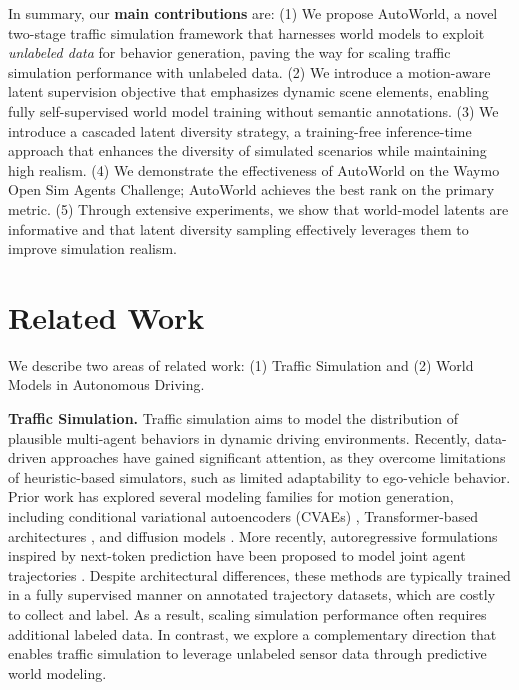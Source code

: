 \documentclass[runningheads]{llncs}
\begin{document}
In summary, our \textbf{main contributions} are: (1) We propose AutoWorld, a novel two-stage traffic simulation framework that harnesses world models to exploit \textit{unlabeled data} for behavior generation, paving the way for scaling traffic simulation performance with unlabeled data. (2) We introduce a motion-aware latent supervision objective that emphasizes dynamic scene elements, enabling fully self-supervised world model training without semantic annotations. (3) We introduce a cascaded latent diversity strategy, a training-free inference-time approach that enhances the diversity of simulated scenarios while maintaining high realism. (4) We demonstrate the effectiveness of AutoWorld on the Waymo Open Sim Agents Challenge; AutoWorld achieves the best rank on the primary metric. (5) Through extensive experiments, we show that world-model latents are informative and that latent diversity sampling effectively leverages them to improve simulation realism.



\vspace{-2mm}

\section{Related Work}
We describe two areas of related work: (1) Traffic Simulation and (2) World Models in Autonomous Driving.

\textbf{Traffic Simulation.} Traffic simulation aims to model the distribution of plausible multi-agent behaviors in dynamic driving environments. Recently, data-driven approaches have gained significant attention, as they overcome limitations of heuristic-based simulators, such as limited adaptability to ego-vehicle behavior. Prior work has explored several modeling families for motion generation, including conditional variational autoencoders (CVAEs) \cite{igl2023hierarchical,suo2021trafficsim,xu2022bits}, Transformer-based architectures \cite{girgis2021latent,ngiam2021scene,shi2024mtr++,zhou2023query}, and diffusion models \cite{huang2024versatile,jiang2023motiondiffuser,lu2024scenecontrol,pronovost2023scenario,zhong2023language,zhong2023guided}. More recently, autoregressive formulations inspired by next-token prediction have been proposed to model joint agent trajectories \cite{wu2024smart,zhang2025trajtok,zhang2025closed,zhou2024behaviorgpt,philion2024trajeglish,DecompGAIL2026,peng2025infgen,pei2025advancing}. Despite architectural differences, these methods are typically trained in a fully supervised manner on annotated trajectory datasets, which are costly to collect and label. As a result, scaling simulation performance often requires additional labeled data. In contrast, we explore a complementary direction that enables traffic simulation to leverage unlabeled sensor data through predictive world modeling.
\end{document}

